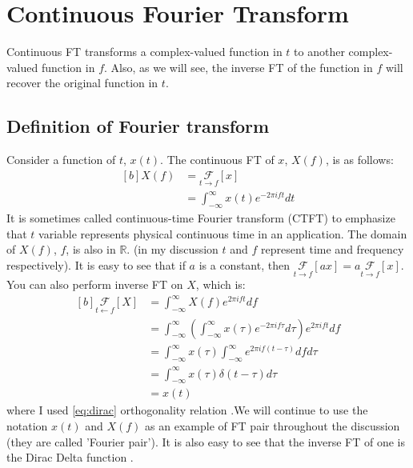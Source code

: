 \documentclass[letterpaper, 11pt]{article}
\newcommand{\fint}{\int_{-\infty}^{\infty}} %
\newcommand{\fourier}[3]{\underset{#1 \rightarrow #3}{\mathcal{F}}[#2]} %
\newcommand{\ifourier}[3]{\underset{#3 \leftarrow #1}{\mathcal{F}}[#2]} %
\newcommand{\ft}[3]{\fint #2 e^{-2\pi i#3#1} d#1} %
\newcommand{\ift}[3]{\fint #2 e^{2\pi i#1#3} d#1} %
\numberwithin{equation}{section}
\numberwithin{figure}{section}
\numberwithin{table}{section}
\begin{document}
\clearpage
\section{Continuous Fourier Transform}
Continuous FT transforms a complex-valued function in \(t\) to another complex-valued function in \(f\). Also, as we will see, the inverse FT of the function in \(f\) will recover the original function in \(t\). 

\subsection{Definition of Fourier transform}
Consider a function of \(t\), \(x(t)\). The continuous FT of \(x\), \(X(f)\), is as follows:
\begin{equation}
	\begin{aligned}[b]
		X(f)	&=\fourier{t}{x}{f} \\
			&=\ft{t}{x(t)}{f}
	\end{aligned}
\end{equation}
It is sometimes called continuous-time Fourier transform (CTFT) to emphasize that \(t\) variable represents physical continuous time in an application. The domain of \(X(f)\), \(f\), is also in \(\mathbb{R}\). (in my discussion \(t\) and \(f\) represent time and frequency respectively). It is easy to see that if \(a\) is a constant, then \(\fourier{t}{ax}{f} = a \fourier{t}{x}{f}\). You can also perform inverse FT on \(X\), which is:
\begin{equation}
	\begin{aligned}[b]
		\ifourier{f}{X}{t}	&= \ift{f}{X(f)}{t} \\
					&= \ift{f}{\left ( \ft{\tau}{x(\tau)}{f}\right )}{t} \\
					&= \fint x(\tau) \fint e^{2\pi if(t - \tau)} df d\tau \\
					&= \fint x(\tau) \delta (t - \tau) d\tau \\
					&= x(t)
	\end{aligned}
\end{equation}
where I used \eqref{eq:dirac} orthogonality relation .We will continue to use the notation \(x(t)\) and \(X(f)\) as an example of FT pair throughout the discussion (they are called 'Fourier pair'). It is also easy to see that the inverse FT of one is the Dirac Delta function \cite{james}.

\end{document}
